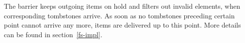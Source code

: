 
The barrier  keeps outgoing items on hold and filters out invalid elements, when corresponding tombstones arrive. 
As soon as no tombstones preceding certain point cannot arrive any more, items are delivered  up to this point. 
%
More details can be found  in section~\ref{fs-impl}.




